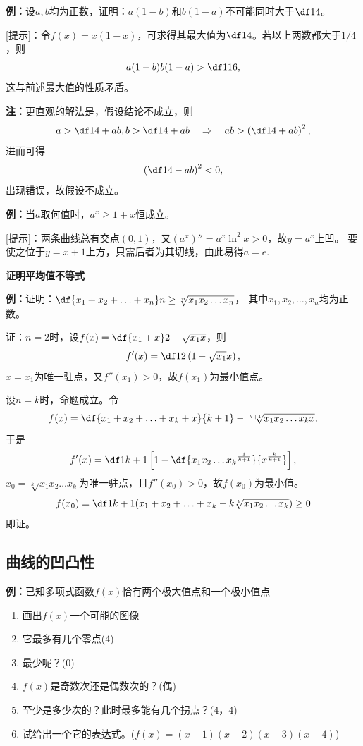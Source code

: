 % 

{\bf 例：}设$a,b$均为正数，证明：$a(1-b)$和$b(1-a)$不可能同时大于$\df14$。

[提示]：令$f(x)=x(1-x)$，可求得其最大值为$\df14$。若以上两数都大于$1/4$，则
$$a(1-b)b(1-a)>\df1{16},$$
这与前述最大值的性质矛盾。

{\bf 注：}更直观的解法是，假设结论不成立，则
$$a>\df14+ab,b>\df14+ab\quad\Rightarrow\quad
ab>\left(\df14+ab\right)^2,$$
进而可得
$$\left(\df14-ab\right)^2<0,$$
出现错误，故假设不成立。

{\bf 例：}当$a$取何值时，$a^x\geq1+x$恒成立。

[提示]：两条曲线总有交点$(0,1)$，又$(a^x)''=a^x\ln^2x>0$，故$y=a^x$上凹。
要使之位于$y=x+1$上方，只需后者为其切线，由此易得$a=e$.

\begin{shaded}
{\bf 证明平均值不等式}

{\bf 例：}证明：$\df{x_1+x_2+\ldots+x_n}n\geq\sqrt[n]{x_1x_2\ldots x_n}$，
其中$x_1,x_2,\ldots,x_n$均为正数。

证：$n=2$时，设$f(x)=\df{x_1+x}2-\sqrt{x_1x}$，则
$$f'(x)=\df12\left(1-\sqrt{x_1}x\right),$$
$x=x_1$为唯一驻点，又$f''(x_1)>0$，故$f(x_1)$为最小值点。

设$n=k$时，命题成立。令
$$f(x)=\df{x_1+x_2+\ldots+x_k+x}{k+1}-\sqrt[k+1]{x_1x_2\ldots x_kx},$$
于是
$$f'(x)=\df1{k+1}\left[1-\df{{x_1x_2\ldots x_k}^{\frac1{k+1}}}
{x^{\frac k{k+1}}}\right],$$
$x_0=\sqrt[k]{x_1x_2\ldots x_k}$为唯一驻点，且$f''(x_0)>0$，故$f(x_0)$为最小值。
$$f(x_0)=\df1{k+1}(x_1+x_2+\ldots+x_k-k\sqrt[k]{x_1x_2\ldots x_k})\geq 0$$
即证。
\end{shaded}

\subsection{曲线的凹凸性}



{\bf 例：}已知多项式函数$f(x)$恰有两个极大值点和一个极小值点
\begin{enumerate}[(1)]
  \setlength{\itemindent}{1cm}
  \item 画出$f(x)$一个可能的图像
  \item 它最多有几个零点\hfill(4)
  \item 最少呢？\hfill(0)
  \item $f(x)$是奇数次还是偶数次的？\hfill(偶)
  \item 至少是多少次的？此时最多能有几个拐点？\hfill(4，4)
  \item 试给出一个它的表达式。\hfill($f(x)=(x-1)(x-2)(x-3)(x-4)$)
\end{enumerate}

